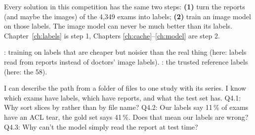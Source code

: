 \begin{keyidea}
Every solution in this competition has the same two steps:
\textbf{(1)} turn the reports (and maybe the images) of the 4,349 exams into labels;
\textbf{(2)} train an image model on those labels.
The image model can never be much better than its labels. Chapter~\ref{ch:labels} is step 1, Chapters
\ref{ch:cache}--\ref{ch:model} are step 2.
\end{keyidea}

\begin{wordcheck}
: training on labels that are cheaper but noisier than the real thing (here: labels read
from reports instead of doctors' image labels). : the trusted reference labels (here: the 58).
\end{wordcheck}

\begin{checkpoint}
\begin{itemize}
\done I can describe the path from a folder of  files to one study with its series.
\done I know which exams have labels, which have reports, and what the test set has.
\quiz Q4.1: Why sort slices by  rather than by file name?
\quiz Q4.2: Our labels say 11\,\% of exams have an ACL tear, the gold set says 41\,\%. Does that mean our labels
      are wrong?
\quiz Q4.3: Why can't the model simply read the report at test time?
\end{itemize}
\end{checkpoint}
